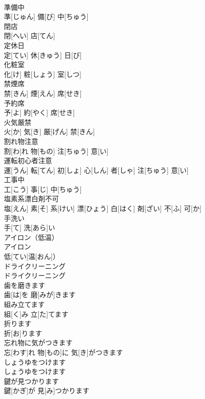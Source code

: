 \documentclass[8pt]{extreport}
\begin{document}
\begin{CJK}{UTF8}{min}
\\	準備中	
\\	準[じゅん] 備[び] 中[ちゅう]		
\\	閉店	
\\	閉[へい] 店[てん]		
\\	定休日	
\\	定[てい] 休[きゅう] 日[び]		
\\	化粧室	
\\	化[け] 粧[しょう] 室[しつ]		
\\	禁煙席	
\\	禁[きん] 煙[えん] 席[せき]		
\\	予約席	
\\	予[よ] 約[やく] 席[せき]		
\\	火気厳禁	
\\	火[か] 気[き] 厳[げん] 禁[きん]		
\\	割れ物注意	
\\	割[わ]れ 物[もの] 注[ちゅう] 意[い]		
\\	運転初心者注意	
\\	運[うん] 転[てん] 初[しょ] 心[しん] 者[しゃ] 注[ちゅう] 意[い]		
\\	工事中	
\\	工[こう] 事[じ] 中[ちゅう]		
\\	塩素系漂白剤不可	
\\	塩[えん] 素[そ] 系[けい] 漂[ひょう] 白[はく] 剤[ざい] 不[ふ] 可[か]		
\\	手洗い	
\\	手[て] 洗[あら]い		
\\	アイロン（低温）	
\\	アイロン
\\	低[てい]温[おん]）		
\\	ドライクリーニング	
\\	ドライクリーニング		
\\	歯を磨きます	
\\	歯[は]を 磨[みが]きます		
\\	組み立てます	
\\	組[く]み 立[た]てます		
\\	折ります	
\\	折[お]ります		
\\	忘れ物に気がつきます	
\\	忘[わす]れ 物[もの]に 気[き]がつきます		
\\	しょうゆをつけます	
\\	しょうゆをつけます		
\\	鍵が見つかります	
\\	鍵[かぎ]が 見[み]つかります		

\end{CJK}
\end{document}
